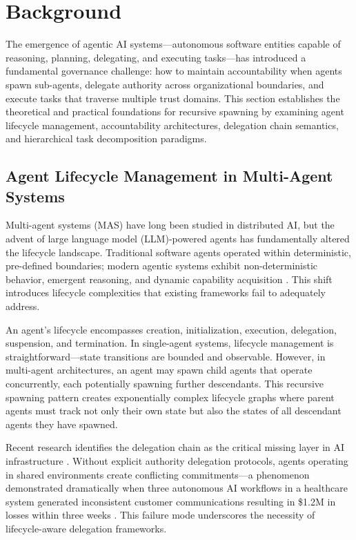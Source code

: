 \section{Background}

The emergence of agentic AI systems—autonomous software entities capable of reasoning, planning, delegating, and executing tasks—has introduced a fundamental governance challenge: how to maintain accountability when agents spawn sub-agents, delegate authority across organizational boundaries, and execute tasks that traverse multiple trust domains. This section establishes the theoretical and practical foundations for recursive spawning by examining agent lifecycle management, accountability architectures, delegation chain semantics, and hierarchical task decomposition paradigms.

\subsection{Agent Lifecycle Management in Multi-Agent Systems}

Multi-agent systems (MAS) have long been studied in distributed AI, but the advent of large language model (LLM)-powered agents has fundamentally altered the lifecycle landscape. Traditional software agents operated within deterministic, pre-defined boundaries; modern agentic systems exhibit non-deterministic behavior, emergent reasoning, and dynamic capability acquisition \cite{intelligent_delegation_arxiv2602}. This shift introduces lifecycle complexities that existing frameworks fail to adequately address.

An agent's lifecycle encompasses creation, initialization, execution, delegation, suspension, and termination. In single-agent systems, lifecycle management is straightforward—state transitions are bounded and observable. However, in multi-agent architectures, an agent may spawn child agents that operate concurrently, each potentially spawning further descendants. This recursive spawning pattern creates exponentially complex lifecycle graphs where parent agents must track not only their own state but also the states of all descendant agents they have spawned.

Recent research identifies the delegation chain as the critical missing layer in AI infrastructure \cite{delegated_authority_bxai}. Without explicit authority delegation protocols, agents operating in shared environments create conflicting commitments—a phenomenon demonstrated dramatically when three autonomous AI workflows in a healthcare system generated inconsistent customer communications resulting in \$1.2M in losses within three weeks \cite{decision_rights_bxai}. This failure mode underscores the necessity of lifecycle-aware delegation frameworks.

